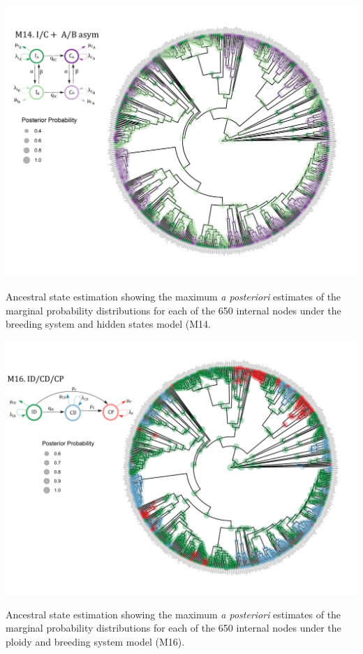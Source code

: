 \begin{suppfigure}
\includegraphics[width=\textwidth]{figS12.pdf}
\caption{Ancestral state estimation showing the maximum \emph{a posteriori} estimates of the marginal probability distributions for each of the 650 internal nodes under the breeding system and hidden states model (M14.} %
\label{suppfigure:ICABasr}
\end{suppfigure}


\begin{suppfigure}
\includegraphics[width=\textwidth]{figS13.pdf}
\caption{Ancestral state estimation showing the maximum \emph{a posteriori} estimates of the marginal probability distributions for each of the 650 internal nodes under the ploidy and breeding system model (M16).} %
\label{suppfigure:IDCDCPnodipasr}
\end{suppfigure}



